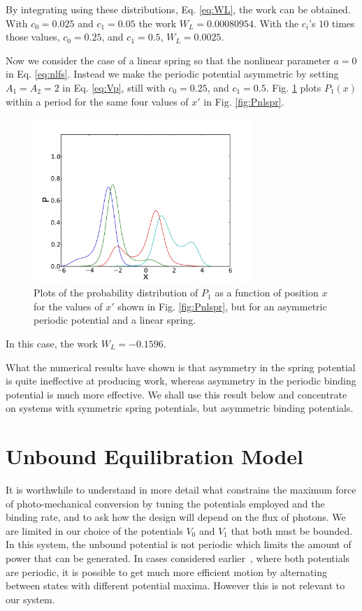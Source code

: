 \documentclass[journal = mamobx, manuscript = article]{achemso}
\begin{document}
By integrating using these distributions, Eq. \ref{eq:WL}, the work can be
obtained.  With $c_0 = 0.025$ and $c_1 = 0.05$ the work $W_L =   0.00080954$.
With the $c_i$'s $10$ times those values, 
$c_0 = 0.25$, and $c_1 = 0.5$, $W_L =  0.0025$. 

Now we consider the case of a linear spring so that the nonlinear parameter $a=0$
in Eq. \ref{eq:nlfs}. Instead we make the periodic potential asymmetric by
setting  $A_1 = A_2 =2$ in Eq. \ref{eq:Vp}, still with
$c_0 = 0.25$, and $c_1 = 0.5$. 
Fig. \ref{fig:Pasvp} plots $P_1(x)$ within a period for the same four values of $x'$ in Fig. \ref{fig:Pnlspr}.
\begin{figure}[htp]
\begin{center}
\includegraphics[width=3.25in]{Pasvp}
\caption{
Plots of the probability distribution of $P_1$ as a function of position $x$
for the values of $x'$ shown in Fig. \ref{fig:Pnlspr}, but for an asymmetric periodic potential and a linear
spring.
}
\label{fig:Pasvp}
\end{center}
\end{figure}
In this case, the work $W_L = -0.1596$.

What the numerical results have shown is that asymmetry in the spring potential
is quite ineffective at producing work, whereas asymmetry in the periodic
binding potential is much more effective. We shall use this result below and concentrate
on systems with symmetric spring potentials, but asymmetric binding potentials.

\section{Unbound Equilibration Model}
\label{sec:UEM}
It is worthwhile to
understand in more detail what constrains the maximum force of photo-mechanical conversion by
tuning the potentials employed and the binding rate, and to ask how the design will depend on 
the flux of photons. We are limited in our choice of the potentials $V_0$ and
$V_1$ that both must be bounded. In this system, the unbound potential is not periodic which
limits the amount of power that can be generated. In cases considered earlier~\cite{ProstPRL}, where both
potentials are periodic, it is possible to get much more efficient motion by
alternating between states with different potential maxima. However this is not
relevant to our system.
\end{document}
